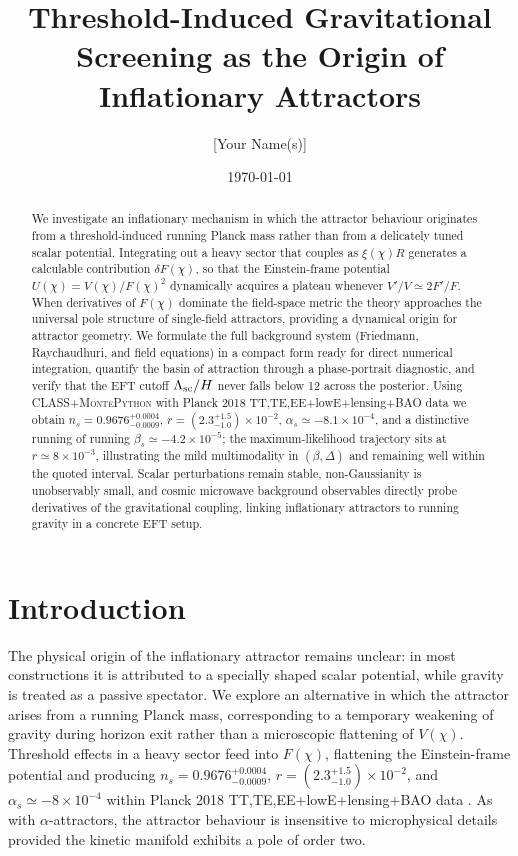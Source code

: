 \documentclass[11pt,a4paper]{article}
\title{Threshold-Induced Gravitational Screening as the Origin of Inflationary Attractors}
\author{[Your Name(s)]}
\date{\today}
\begin{document}
\maketitle

\begin{abstract}
We investigate an inflationary mechanism in which the attractor behaviour originates from a threshold-induced running Planck mass rather than from a delicately tuned scalar potential. Integrating out a heavy sector that couples as $\xi(\chi) R$ generates a calculable contribution $\delta F(\chi)$, so that the Einstein-frame potential $U(\chi)=V(\chi)/F(\chi)^2$ dynamically acquires a plateau whenever $V'/V\simeq2F'/F$. When derivatives of $F(\chi)$ dominate the field-space metric the theory approaches the universal pole structure of single-field attractors, providing a dynamical origin for attractor geometry. We formulate the full background system (Friedmann, Raychaudhuri, and field equations) in a compact form ready for direct numerical integration, quantify the basin of attraction through a phase-portrait diagnostic, and verify that the EFT cutoff $\Lambda_{\rm sc}/H$ never falls below 12 across the posterior. Using \textsc{CLASS}+\textsc{MontePython} with Planck 2018 TT,TE,EE+lowE+lensing+BAO data we obtain $n_s=0.9676^{+0.0004}_{-0.0009}$, $r=(2.3^{+1.5}_{-1.0})\times10^{-2}$, $\alpha_s\simeq-8.1\times10^{-4}$, and a distinctive running of running $\beta_s\simeq-4.2\times10^{-5}$; the maximum-likelihood trajectory sits at $r\simeq8\times10^{-3}$, illustrating the mild multimodality in $(\beta,\Delta)$ and remaining well within the quoted interval. Scalar perturbations remain stable, non-Gaussianity is unobservably small, and cosmic microwave background observables directly probe derivatives of the gravitational coupling, linking inflationary attractors to running gravity in a concrete EFT setup.
\end{abstract}

\section{Introduction}
\label{sec:intro}
The physical origin of the inflationary attractor remains unclear: in most constructions it is attributed to a specially shaped scalar potential, while gravity is treated as a passive spectator. We explore an alternative in which the attractor arises from a running Planck mass, corresponding to a temporary weakening of gravity during horizon exit rather than a microscopic flattening of $V(\chi)$. Threshold effects in a heavy sector feed into $F(\chi)$, flattening the Einstein-frame potential and producing $n_s=0.9676^{+0.0004}_{-0.0009}$, $r=(2.3^{+1.5}_{-1.0})\times10^{-2}$, and $\alpha_s\simeq-8\times10^{-4}$ within Planck 2018 TT,TE,EE+lowE+lensing+BAO data \cite{Planck2018}. As with $\alpha$-attractors, the attractor behaviour is insensitive to microphysical details provided the kinetic manifold exhibits a pole of order two.
\end{document}

